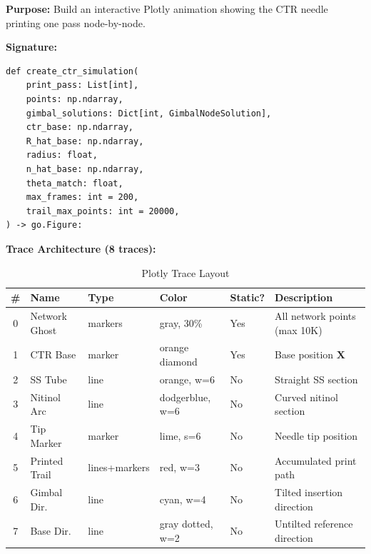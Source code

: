 \documentclass[11pt,a4paper]{article}
\begin{document}
\textbf{Purpose:} Build an interactive Plotly animation showing the CTR needle printing one pass node-by-node.

\textbf{Signature:}
\begin{lstlisting}
def create_ctr_simulation(
    print_pass: List[int],
    points: np.ndarray,
    gimbal_solutions: Dict[int, GimbalNodeSolution],
    ctr_base: np.ndarray,
    R_hat_base: np.ndarray,
    radius: float,
    n_hat_base: np.ndarray,
    theta_match: float,
    max_frames: int = 200,
    trail_max_points: int = 20000,
) -> go.Figure:
\end{lstlisting}

\textbf{Trace Architecture (8 traces):}

\begin{table}[H]
\centering
\caption{Plotly Trace Layout}
\begin{tabular}{clllll}
\toprule
\textbf{\#} & \textbf{Name} & \textbf{Type} & \textbf{Color} & \textbf{Static?} & \textbf{Description} \\
\midrule
0 & Network Ghost & markers & gray, 30\% & Yes & All network points (max 10K) \\
1 & CTR Base & marker & orange diamond & Yes & Base position $\mathbf{X}$ \\
2 & SS Tube & line & orange, w=6 & No & Straight SS section \\
3 & Nitinol Arc & line & dodgerblue, w=6 & No & Curved nitinol section \\
4 & Tip Marker & marker & lime, s=6 & No & Needle tip position \\
5 & Printed Trail & lines+markers & red, w=3 & No & Accumulated print path \\
6 & Gimbal Dir. & line & cyan, w=4 & No & Tilted insertion direction \\
7 & Base Dir. & line & gray dotted, w=2 & No & Untilted reference direction \\
\bottomrule
\end{tabular}
\end{table}
\end{document}
